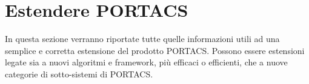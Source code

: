 \section{Estendere PORTACS}
In questa sezione verranno riportate tutte quelle informazioni utili ad una semplice e corretta estensione del prodotto PORTACS. Possono essere estensioni legate sia a nuovi algoritmi e framework, più efficaci o efficienti, che a nuove categorie di sotto-sistemi di PORTACS.














